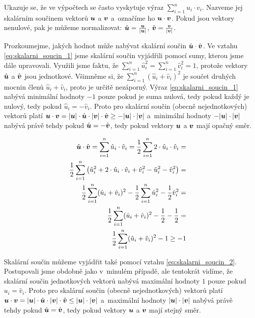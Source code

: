 Ukazuje se, že ve výpočtech se často vyskytuje výraz  \(\sum_{i=1}^{n} u_i \cdot v_i\).
Nazveme jej skalárním součinem vektorů \(\boldsymbol{u}\) a \(\boldsymbol{v}\) a~označíme ho \(\boldsymbol{u} \cdot \boldsymbol{v}\).
Pokud jsou vektory nenulové, pak je můžeme normalizovat: \(\hat{\boldsymbol{u}} = \frac{\boldsymbol{u}}{|\boldsymbol{u}|}\), \(\hat{\boldsymbol{v}} = \frac{\boldsymbol{v}}{|\boldsymbol{v}|}\).

Prozkoumejme, jakých hodnot může nabývat skalární součin \(\hat{\boldsymbol{u}} \cdot \hat{\boldsymbol{v}}\). Ve vztahu \eqref{eq:skalarni_soucin_1} jsme skalární součin
vyjádřili pomocí sumy, kterou jsme dále upravovali. Využili jsme faktu, že \(\sum_{i=1}^{n} \hat{u}_i^2 = \sum_{i=1}^{n} \hat{v}_i^2 = 1\), protože vektory
\(\hat{\boldsymbol{u}}\) a \(\hat{\boldsymbol{v}}\) jsou jednotkové. Všimněme si, že \(\sum_{i=1}^{n} (\hat{u}_i + \hat{v}_i)^2\) je součet druhých mocnin členů
\(\hat{u}_i + \hat{v}_i\), proto je určitě nezáporný. Výraz \eqref{eq:skalarni_soucin_1} nabývá minimální hodnoty \(-1\) pouze pokud je suma nulová, tedy pokud každý je nulový, tedy pokud
\(\hat{u}_i = -\hat{v}_i\). Proto pro skalární součin (obecně nejednotkových) vektorů platí \(\boldsymbol{u} \cdot \boldsymbol{v} = |\boldsymbol{u}| \cdot \hat{\boldsymbol{u}} \cdot |\boldsymbol{v}| \cdot \hat{\boldsymbol{v}} \geq -|\boldsymbol{u}| \cdot |\boldsymbol{v}|\)
a~minimální hodnoty \(-|\boldsymbol{u}| \cdot |\boldsymbol{v}|\) nabývá právě tehdy pokud \(\hat{\boldsymbol{u}} = -\hat{\boldsymbol{v}}\), tedy pokud vektory \(\boldsymbol{u}\) a \(\boldsymbol{v}\) mají opačný směr.

\begin{equation}
\label{eq:skalarni_soucin_1}
\begin{split}
\hat{\boldsymbol{u}} \cdot \hat{\boldsymbol{v}} = \sum_{i=1}^{n} \hat{u}_i \cdot \hat{v}_i = \frac{1}{2} \sum_{i=1}^{n} 2 \cdot \hat{u}_i \cdot \hat{v}_i = \\
\frac{1}{2} \sum_{i=1}^{n} \left(\hat{u}_i^2 + 2 \cdot \hat{u}_i \cdot \hat{v}_i + \hat{v}_i^2 - \hat{u}_i^2 - \hat{v}_i^2 \right) = \\
\frac{1}{2} \sum_{i=1}^{n} (\hat{u}_i + \hat{v}_i)^2 - \frac{1}{2} \sum_{i=1}^{n} \hat{u}_i^2 - \frac{1}{2} \hat{v}_i^2 = \\
\frac{1}{2} \sum_{i=1}^{n} (\hat{u}_i + \hat{v}_i)^2 - \frac{1}{2} - \frac{1}{2} =  \\
\frac{1}{2} \sum_{i=1}^{n} (\hat{u}_i + \hat{v}_i)^2 - 1 \geq -1
\end{split}
\end{equation}

Skalární součin můžeme vyjádřit také pomocí vztahu \eqref{eq:skalarni_soucin_2}. Postupovali jsme obdobně jako v~minulém případě, ale tentokrát
vidíme, že skalární součin jednotkových vektorů nabývá maximální hodnoty \(1\) pouze pokud \(\hat{u}_i = \hat{v}_i\). Proto pro skalární součin (obecně nejednotkových) vektorů platí \(\boldsymbol{u} \cdot \boldsymbol{v} = |\boldsymbol{u}| \cdot \hat{\boldsymbol{u}} \cdot |\boldsymbol{v}| \cdot \hat{\boldsymbol{v}} \leq |\boldsymbol{u}| \cdot |\boldsymbol{v}|\)
a~maximální hodnoty \(|\boldsymbol{u}| \cdot |\boldsymbol{v}|\) nabývá právě tehdy pokud \(\hat{\boldsymbol{u}} = \hat{\boldsymbol{v}}\), tedy pokud vektory \(\boldsymbol{u}\) a \(\boldsymbol{v}\) mají stejný směr.

